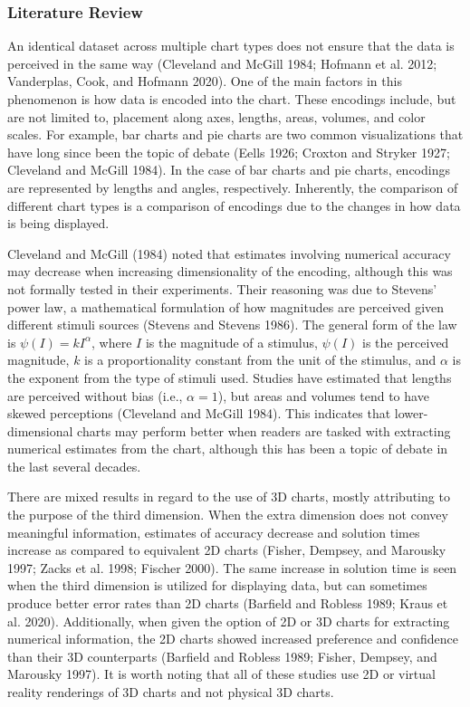 \documentclass[
  letterpaper,
  DIV=11,
  numbers=noendperiod]{scrartcl}
\begin{document}
\subsubsection{Literature Review}\label{literature-review}

An identical dataset across multiple chart types does not ensure that
the data is perceived in the same way (Cleveland and McGill 1984;
Hofmann et al. 2012; Vanderplas, Cook, and Hofmann 2020). One of the
main factors in this phenomenon is how data is encoded into the chart.
These encodings include, but are not limited to, placement along axes,
lengths, areas, volumes, and color scales. For example, bar charts and
pie charts are two common visualizations that have long since been the
topic of debate (Eells 1926; Croxton and Stryker 1927; Cleveland and
McGill 1984). In the case of bar charts and pie charts, encodings are
represented by lengths and angles, respectively. Inherently, the
comparison of different chart types is a comparison of encodings due to
the changes in how data is being displayed.

Cleveland and McGill (1984) noted that estimates involving numerical
accuracy may decrease when increasing dimensionality of the encoding,
although this was not formally tested in their experiments. Their
reasoning was due to Stevens' power law, a mathematical formulation of
how magnitudes are perceived given different stimuli sources (Stevens
and Stevens 1986). The general form of the law is \(\psi(I)=kI^\alpha\),
where \(I\) is the magnitude of a stimulus, \(\psi(I)\) is the perceived
magnitude, \(k\) is a proportionality constant from the unit of the
stimulus, and \(\alpha\) is the exponent from the type of stimuli used.
Studies have estimated that lengths are perceived without bias (i.e.,
\(\alpha=1\)), but areas and volumes tend to have skewed perceptions
(Cleveland and McGill 1984). This indicates that lower-dimensional
charts may perform better when readers are tasked with extracting
numerical estimates from the chart, although this has been a topic of
debate in the last several decades.

There are mixed results in regard to the use of 3D charts, mostly
attributing to the purpose of the third dimension. When the extra
dimension does not convey meaningful information, estimates of accuracy
decrease and solution times increase as compared to equivalent 2D charts
(Fisher, Dempsey, and Marousky 1997; Zacks et al. 1998; Fischer 2000).
The same increase in solution time is seen when the third dimension is
utilized for displaying data, but can sometimes produce better error
rates than 2D charts (Barfield and Robless 1989; Kraus et al. 2020).
Additionally, when given the option of 2D or 3D charts for extracting
numerical information, the 2D charts showed increased preference and
confidence than their 3D counterparts (Barfield and Robless 1989;
Fisher, Dempsey, and Marousky 1997). It is worth noting that all of
these studies use 2D or virtual reality renderings of 3D charts and not
physical 3D charts.
\end{document}
